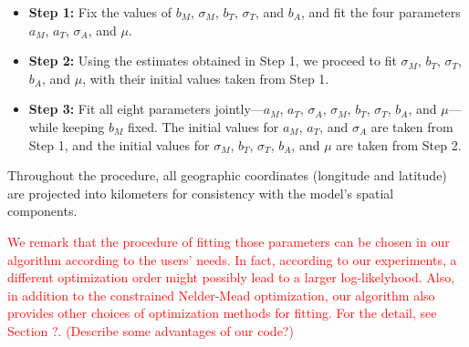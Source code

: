 \documentclass[extra,mreferee]{gji}
\theoremstyle{lemma}
\begin{document}
\begin{itemize}
    \item \textbf{Step 1:} Fix the values of $b_M$, $\sigma_M$, $b_T$, $\sigma_T$, and $b_A$, and fit the four parameters $a_M$, $a_T$, $\sigma_A$, and $\mu$.
    
    \item \textbf{Step 2:} Using the estimates obtained in Step 1, we proceed to fit $\sigma_M$, $b_T$, $\sigma_T$, $b_A$, and $\mu$, with their initial values taken from Step 1.
    
    \item \textbf{Step 3:} Fit all eight parameters jointly—$a_M$, $a_T$, $\sigma_A$, $\sigma_M$, $b_T$, $\sigma_T$, $b_A$, and $\mu$—while keeping $b_M$ fixed. The initial values for $a_M$, $a_T$, and $\sigma_A$ are taken from Step 1, and the initial values for $\sigma_M$, $b_T$, $\sigma_T$, $b_A$, and $\mu$ are taken from Step 2.
\end{itemize}

Throughout the procedure, all geographic coordinates (longitude and latitude) are projected into kilometers for consistency with the model’s spatial components.

\textcolor{red}{We remark that the procedure of fitting those parameters can be chosen in our algorithm according to the users' needs. In fact, according to our experiments, a different optimization order might possibly lead to a larger log-likelyhood. Also, in addition to the constrained Nelder-Mead optimization, our algorithm  also provides other choices of optimization methods for fitting. For the detail, see Section ?. (Describe some advantages of our code?)}
\end{document}
